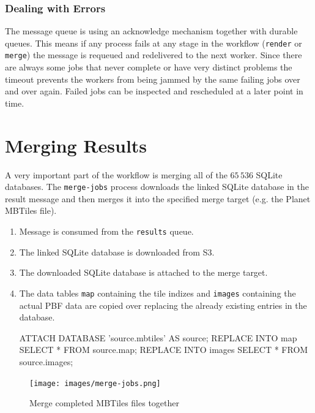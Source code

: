 \subsubsection{Dealing with Errors}

The message queue is using an acknowledge mechanism together with durable queues.
This means if any process fails at any stage in the workflow (\texttt{render} or \texttt{merge}) the message is requeued and redelivered to the next worker.
Since there are always some jobs that never complete or have very distinct problems the timeout prevents the workers from being jammed by the same failing jobs over and over again.
Failed jobs can be inspected and rescheduled at a later point in time.

\newpage{}
\section{Merging Results}

A very important part of the workflow is merging all of the $65\,536$ SQLite databases.
The \texttt{merge-jobs} process downloads the linked SQLite database in the result message
and then merges it into the specified merge target (e.g. the Planet MBTiles file).

\begin{enumerate}  
    \item Message is consumed from the \texttt{results} queue.
    \item The linked SQLite database is downloaded from S3.
    \item The downloaded SQLite database is attached to the merge target.
    \item  The data tables \texttt{map} containing the tile indizes and \texttt{images} containing the actual PBF data are copied over replacing the already existing entries in the database.
    
\begin{sqlcode}
ATTACH DATABASE 'source.mbtiles' AS source;
REPLACE INTO map SELECT * FROM source.map;
REPLACE INTO images SELECT * FROM source.images;
\end{sqlcode}
    
\end{enumerate}

\begin{figure}[H]
  \centering
  \texttt{[image: images/merge-jobs.png]}
  \caption{Merge completed MBTiles files together}
\end{figure}


